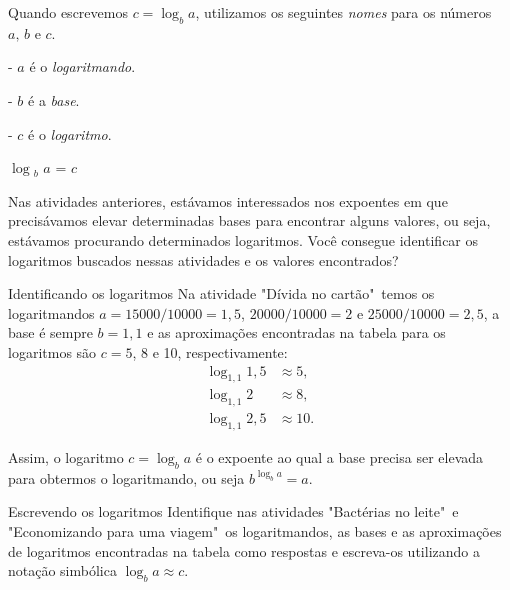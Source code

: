 \begin{observation}{}
Quando escrevemos $c = \log_b a$, utilizamos os seguintes \textit{nomes} para os números $a,\,b$ e $c$.
\begin{center}
\begin{minipage}{0.3\linewidth}
\begin{flushleft}
- \textcolor{penlaranja}{$a$} é o \textcolor{penlaranja}{\textit{logaritmando}}.

- \textcolor{penaqua}{$b$} é a \textcolor{penaqua}{\textit{base}}.

- \textcolor{penazul}{$c$} é o \textcolor{penazul}{\textit{logaritmo}}.

\end{flushleft}
\end{minipage}
\begin{minipage}{0.3\linewidth}

\Huge $\log$\textcolor{penaqua}{$_b$} \textcolor{penlaranja}{$a$} = \textcolor{penazul}{$c$}

\end{minipage}
\end{center}
\end{observation}


Nas atividades anteriores, estávamos interessados nos expoentes em que precisávamos elevar determinadas bases para encontrar alguns valores, ou seja, estávamos procurando determinados logaritmos. Você consegue identificar os logaritmos buscados nessas atividades e os valores encontrados?  

\begin{example}{Identificando os logaritmos}
Na atividade "Dívida no cartão"\, temos os logaritmandos $a=15000/10000=1,5$, $20000/10000=2$ e $25000/10000=2,5$, a base é sempre $b= 1,1$ e as aproximações encontradas na tabela para os logaritmos são $c= 5$, 8 e 10, respectivamente:
\begin{align*}
\log_{1,1} 1,5 &\approx 5,\\ 
\log_{1,1} 2 &\approx 8,\\
\log_{1,1} 2,5 &\approx 10.
\end{align*}
\end{example}


\begin{observation}{}
Assim, o logaritmo $c = \log_b a$ é o expoente ao qual a base precisa ser elevada para obtermos o logaritmando, ou seja $b^{\log_b a}=a$.
\end{observation}


\begin{task}{Escrevendo os logaritmos}
Identifique nas atividades "Bactérias no leite"\, e "Economizando para uma viagem"\, os logaritmandos, as bases e as aproximações de logaritmos encontradas na tabela como respostas e escreva-os utilizando a notação simbólica $\log_b a \approx c$.
\end{task}


